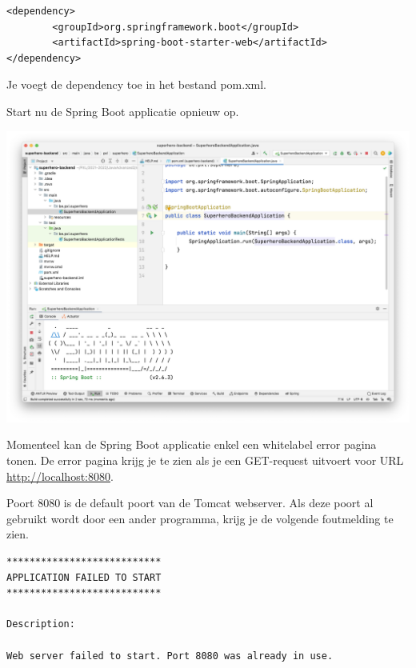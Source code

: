 \begin{lstlisting}
<dependency>
		<groupId>org.springframework.boot</groupId>
		<artifactId>spring-boot-starter-web</artifactId>
</dependency>
\end{lstlisting}
		
Je voegt de dependency toe in het bestand pom.xml.
		
Start nu de Spring Boot applicatie opnieuw op.

\includegraphics[width=\textwidth]{./images/chapter2/first-run.png}

Momenteel kan de Spring Boot applicatie enkel een whitelabel error pagina tonen.  De error pagina krijg je te zien als je een GET-request uitvoert voor URL \url{http://localhost:8080}.


Poort 8080 is de default poort van de Tomcat webserver.  Als deze poort al gebruikt wordt door een ander programma, krijg je de volgende foutmelding te zien.

\begin{lstlisting}[frame=single]
***************************
APPLICATION FAILED TO START
***************************

Description:

Web server failed to start. Port 8080 was already in use.
\end{lstlisting}

